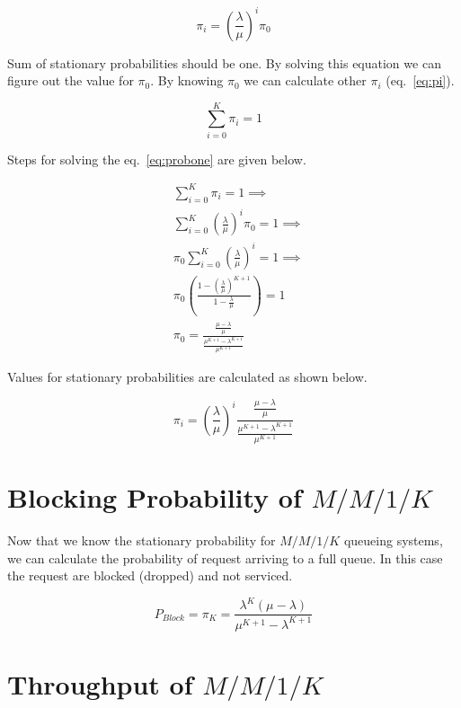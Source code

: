 \documentclass{article}
\begin{document}
\begin{equation}
	\pi_i = {(\frac{\lambda}{\mu})}^{i} \pi_{0}
\label{eq:pi}
\end{equation}

Sum of stationary probabilities should be one.  By solving this equation we can
figure out the value for $\pi_0$. By knowing $\pi_0$ we can calculate other
$\pi_i$ (eq.~\ref{eq:pi}).

\begin{equation}
	\sum_{i=0}^{K}{\pi_i} = 1
\label{eq:probone}
\end{equation}

Steps for solving the eq.~\ref{eq:probone} are given below.

\begin{align*}
	&\sum_{i=0}^{K}{\pi_i} = 1 \implies \\
	&\sum_{i=0}^{K}{{(\frac{\lambda}{\mu})}^{i} \pi_{0}} = 1 \implies \\
	&\pi_{0} \sum_{i=0}^{K}{{(\frac{\lambda}{\mu})}^{i}} = 1 \implies \\
	&\pi_{0} (\frac{1 - {(\frac{\lambda}{\mu})}^{K+1}}{1 - \frac{\lambda}{\mu}}) = 1 \\
	&\pi_{0} = \frac{\frac{\mu - \lambda}{\mu}}{\frac{\mu^{K+1} - \lambda^{K+1}}{{\mu^{K+1}}}}
\end{align*}

Values for stationary probabilities are calculated as shown below.

\begin{equation}
	\pi_i = {(\frac{\lambda}{\mu})}^{i} \frac{\frac{\mu - \lambda}{\mu}}{\frac{\mu^{K+1} - \lambda^{K+1}}{{\mu^{K+1}}}}
\label{eq:stationary_prob}
\end{equation}


\section{Blocking Probability of $M/M/1/K$}

Now that we know the stationary probability for $M/M/1/K$ queueing systems, we
can calculate the probability of request arriving to a full queue. In this case
the request are blocked (dropped) and not serviced.

\begin{equation}
	P_{Block} = \pi_{K} = \frac{\lambda^K (\mu - \lambda)}{\mu^{K+1} - \lambda^{K+1}}
\end{equation}


\section{Throughput of $M/M/1/K$}
\end{document}
